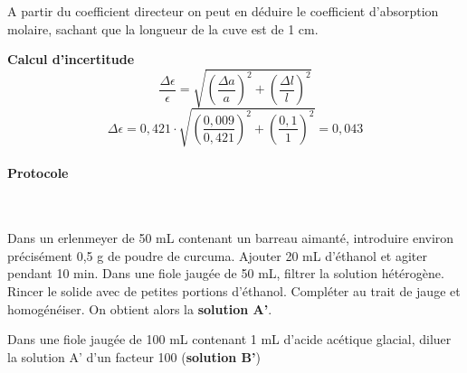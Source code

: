 \documentclass[twoside,a4paper,11pt,answers]{exam}
\begin{document}
\begin{questions}
\begin{framed}
\begin{solution}[3cm]
A partir du coefficient directeur on peut en déduire le coefficient d'absorption molaire, sachant que la longueur de la cuve est de 1 cm.
\par \textbf{Calcul d'incertitude}
\begin{equation*}
    \frac{\Delta \epsilon}{\epsilon} = \sqrt{\left(\frac{\Delta a}{a}\right)^{2} + \left(\frac{\Delta l}{l}\right)^{2} }
\end{equation*}
\begin{equation*}
    \Delta \epsilon = 0,421 \cdot \sqrt{\left(\frac{0,009}{0,421}\right)^{2} + \left(\frac{0,1}{1}\right)^{2} } = 0,043
\end{equation*}


\end{solution}
\end{framed}

\paragraph{Protocole}

~

Dans un erlenmeyer de 50 mL contenant un barreau aimanté, introduire environ précisément 0,5 g de poudre de curcuma. Ajouter 20 mL d’éthanol et agiter pendant 10 min. Dans une fiole jaugée de 50 mL, filtrer la solution hétérogène. Rincer le solide avec de petites portions d'éthanol. Compléter au trait de jauge et homogénéiser. On obtient alors la \textbf{solution A'}.

\par Dans une fiole jaugée de 100 mL contenant 1 mL d’acide acétique glacial, diluer la solution A’ d’un  facteur 100 (\textbf{solution B'})


\end{questions}
\end{document}
